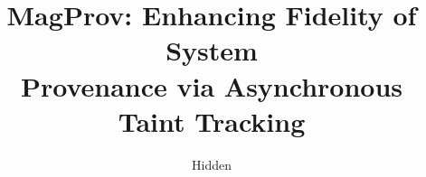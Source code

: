 \title{MagProv: Enhancing Fidelity of System \\ 
Provenance via Asynchronous Taint Tracking}

\ifdefined\DRAFT
 \pagestyle{fancyplain}
 \rhead{\thedate}
\fi

\author{Hidden}

